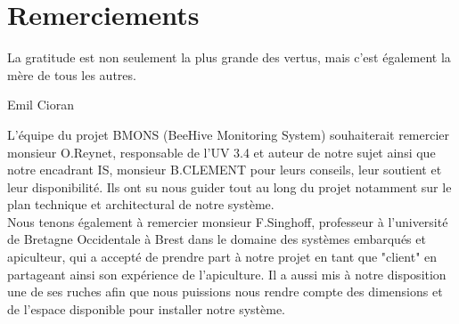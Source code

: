 ﻿
\chapter{Remerciements}
\epigraph{La gratitude est non seulement la plus grande des vertus, mais c'est également la mère de tous les autres.}{Emil Cioran}

L'équipe du projet BMONS (BeeHive Monitoring System) souhaiterait remercier monsieur O.Reynet, responsable de l'UV 3.4 et auteur de notre sujet ainsi que notre encadrant IS, monsieur B.CLEMENT pour leurs conseils, leur soutient et leur disponibilité. Ils ont su nous guider tout au long du projet notamment sur le plan technique et architectural de notre système. \\

Nous tenons également à remercier monsieur F.Singhoff, professeur à l'université de Bretagne Occidentale à Brest dans le domaine des systèmes embarqués et apiculteur, qui a accepté de prendre part à notre projet en tant que "client" en partageant ainsi son expérience de l'apiculture. Il a aussi mis à notre disposition une de ses ruches afin que nous puissions nous rendre compte des dimensions et de l'espace disponible pour installer notre système.
       
 
